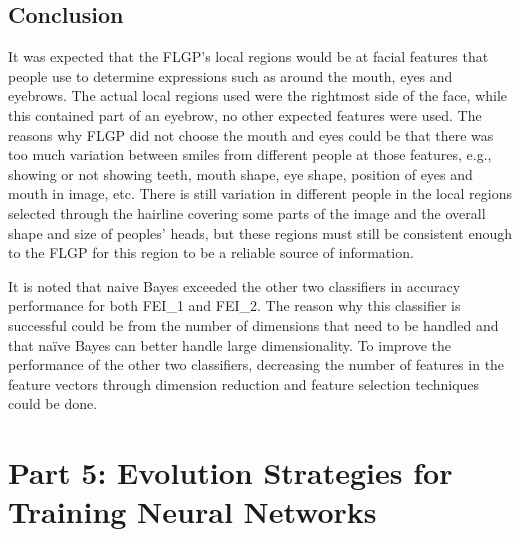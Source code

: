 \documentclass{article}
\begin{document}
\subsection*{Conclusion}
It was expected that the FLGP's local regions would be at facial features that people use to determine expressions such as around the mouth, eyes and eyebrows. The actual local regions used were the rightmost side of the face, while this contained part of an eyebrow, no other expected features were used. The reasons why FLGP did not choose the mouth and eyes could be that there was too much variation between smiles from different people at those features, e.g., showing or not showing teeth, mouth shape, eye shape, position of eyes and mouth in image, etc. There is still variation in different people in the local regions selected through the hairline covering some parts of the image and the overall shape and size of peoples' heads, but these regions must still be consistent enough to the FLGP for this region to be a reliable source of information. \par
\noindent It is noted that naive Bayes exceeded the other two classifiers in accuracy performance for both FEI\_1 and FEI\_2. The reason why this classifier is successful could be from the number of dimensions that need to be handled and that naïve Bayes can better handle large dimensionality. To improve the performance of the other two classifiers, decreasing the number of features in the feature vectors through dimension reduction and feature selection techniques could be done. \par
\section*{Part 5: Evolution Strategies for Training Neural Networks}
\end{document}
